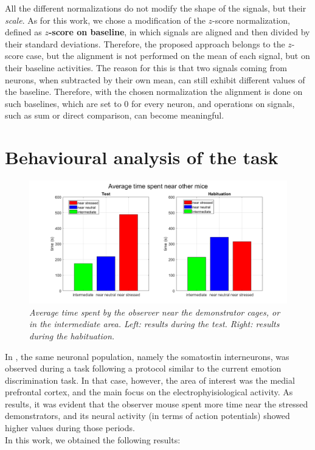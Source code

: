 \documentclass[12pt, a4paper]{report}
\begin{document}
All the different normalizations do not modify the shape of the signals, but their \textit{scale}. As for this work, we chose a modification of the $z$-score normalization, defined as \textbf{$z$-score on baseline}, in which signals are aligned and then divided by their standard deviations. Therefore, the proposed approach belongs to the $z$-score case, but the alignment is not performed on the mean of each signal, but on their baseline activities. The reason for this is that two signals coming from neurons, when subtracted by their own mean, can still exhibit different values of the baseline. Therefore, with the chosen normalization the alignment is done on such baselines, which are set to $0$ for every neuron, and operations on signals, such as sum or direct comparison, can become meaningful.



\section{Behavioural analysis of the task}


\begin{figure}[H]
	
	\centering
	
	\hspace*{-1 cm}
	\includegraphics[scale=.45]{times.png} 
	\caption{\textit{Average time spent by the observer near the demonstrator cages, or in the intermediate area. Left: results during the test. Right: results during the habituation. }} \label{times}
	
\end{figure}

In \cite{8}, the same neuronal population, namely the somatostin interneurons, was observed during a task following a protocol similar to the current emotion discrimination task. In that case, however, the area of interest was the medial prefrontal cortex, and the main focus on the electrophyisiological activity. As results, it was evident that the observer mouse spent more time near the stressed demonstrators, and its neural activity (in terms of action potentials) showed higher values during those periods.\\
In this work, we obtained the following results:
\end{document}
